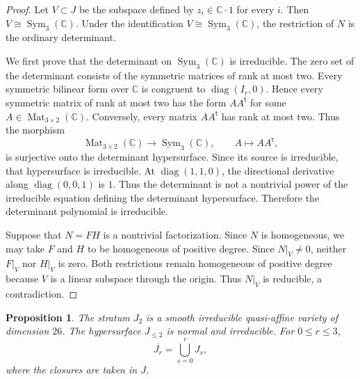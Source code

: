 \documentclass[12pt]{article}
\newtheorem{proposition}[theorem]{Proposition}
\theoremstyle{definition}
\begin{document}
\begin{proof}
Let \(V\subset J\) be the subspace defined by \(z_i\in\mathbb C\cdot1\) for
every \(i\). Then \(V\cong\operatorname{Sym}_3(\mathbb C)\). Under the
identification \(V\cong\operatorname{Sym}_3(\mathbb C)\), the restriction of
\(N\) is the ordinary determinant.

We first prove that the determinant on \(\operatorname{Sym}_3(\mathbb C)\) is
irreducible. The zero set of the determinant consists of the symmetric
matrices of rank at most two. Every symmetric bilinear form over \(\mathbb C\)
is congruent to \(\operatorname{diag}(I_r,0)\). Hence every symmetric matrix of rank at
most two has the form \(AA^{\mathsf t}\) for some
\(A\in\operatorname{Mat}_{3\times2}(\mathbb C)\). Conversely, every matrix
\(AA^{\mathsf t}\) has rank at most two. Thus the morphism
\[
    \operatorname{Mat}_{3\times2}(\mathbb C)\longrightarrow
    \operatorname{Sym}_3(\mathbb C),
    \qquad A\longmapsto AA^{\mathsf t},
\]
is surjective onto the determinant hypersurface. Since its source is
irreducible, that hypersurface is irreducible. At
\(\operatorname{diag}(1,1,0)\), the directional derivative along
\(\operatorname{diag}(0,0,1)\) is \(1\). Thus the determinant is not a
nontrivial power of the
irreducible equation defining the determinant hypersurface. Therefore the
determinant polynomial is irreducible.

Suppose that \(N=FH\) is a nontrivial factorization. Since \(N\) is
homogeneous, we may take \(F\) and \(H\) to be homogeneous of positive degree.
Since \(N|_V\ne0\), neither \(F|_V\) nor \(H|_V\) is zero. Both
restrictions remain homogeneous of positive degree because \(V\) is a
linear subspace through the origin. Thus \(N|_V\) is reducible, a
contradiction.
\end{proof}

\begin{proposition}\label{rank-two-geometry}
The stratum \(J_2\) is a smooth irreducible quasi-affine variety of
dimension \(26\). The hypersurface \(J_{\leq2}\) is normal and irreducible.
For \(0\leq r\leq3\),
\[
    \overline{J_r}=\bigcup_{s=0}^rJ_s,
\]
where the closures are taken in \(J\).
\end{proposition}
\end{document}

